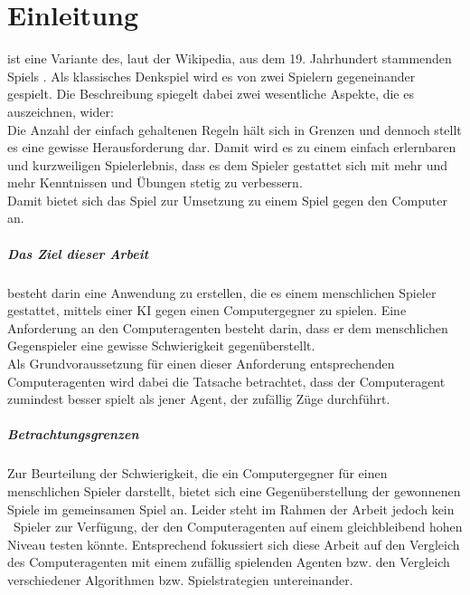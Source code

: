 \chapter{Einleitung}
\mxZitat{\ot} ist eine Variante des, laut der Wikipedia, aus dem 19. Jahrhundert stammenden Spiels  \cite{Wiki:EN:Reversi}. Als klassisches Denkspiel wird es von zwei Spielern gegeneinander gespielt. Die Beschreibung  \cite{Rose} spiegelt dabei zwei wesentliche Aspekte, die es auszeichnen, wider:
\\Die Anzahl der einfach gehaltenen Regeln hält sich in Grenzen und dennoch stellt es eine gewisse Herausforderung dar. Damit wird es zu einem einfach erlernbaren und kurzweiligen Spielerlebnis, dass es dem Spieler gestattet sich mit mehr und mehr Kenntnissen und Übungen stetig zu verbessern.
\\Damit bietet sich das Spiel zur Umsetzung zu einem Spiel gegen den Computer an.
\paragraph{Das Ziel dieser Arbeit} besteht darin eine Anwendung zu erstellen, die es einem menschlichen Spieler gestattet, mittels einer \ac{KI} gegen einen Computergegner \mxZitat{\ot} \linebreak zu spielen. Eine Anforderung an den Computeragenten besteht darin, dass er dem menschlichen Gegenspieler eine gewisse Schwierigkeit gegenüberstellt.
\\Als Grundvoraussetzung für einen dieser Anforderung entsprechenden Computeragenten wird dabei die Tatsache betrachtet, dass der Computeragent zumindest besser spielt als jener Agent, der zufällig Züge durchführt.
\paragraph{Betrachtungsgrenzen}
Zur Beurteilung der Schwierigkeit, die ein Computergegner für einen menschlichen Spieler darstellt, bietet sich eine Gegenüberstellung der gewonnenen Spiele im gemeinsamen Spiel an. Leider steht im Rahmen der Arbeit jedoch kein \ot\ Spieler zur Verfügung, der den Computeragenten auf einem gleichbleibend hohen Niveau testen könnte. Entsprechend fokussiert sich diese Arbeit auf den Vergleich des Computeragenten mit einem zufällig spielenden Agenten bzw. den Vergleich verschiedener Algorithmen bzw. Spielstrategien untereinander.
\newpage

